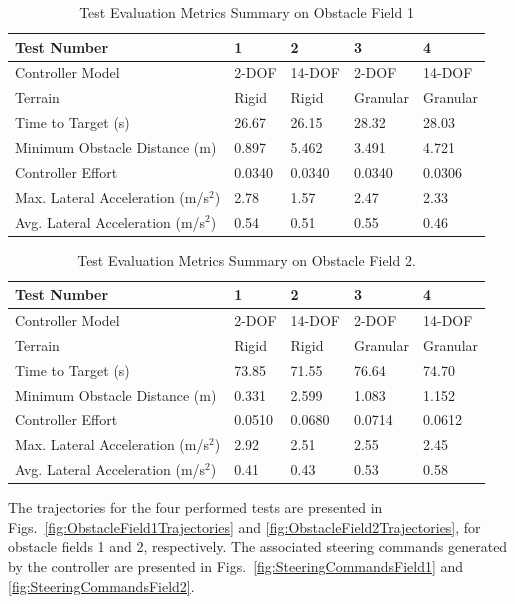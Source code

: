 \documentclass[12pt,onecolumn]{report}
\begin{document}
\begin{table}
		\centering
\begin{tabular}{ ||p{6cm}|p{1.8cm}|p{1.8cm}|p{1.8cm}|p{1.8cm}||  }
		\hline
		Test Number & 1 & 2 & 3 & 4\\
		\hline
		Controller Model & 2-DOF & 14-DOF & 2-DOF & 14-DOF\\
		\hline
		Terrain & Rigid & Rigid & Granular & Granular\\
		\hline
		Time to Target (s)  & 26.67 & 26.15 & 28.32 & 28.03\\ 
		\hline
		Minimum Obstacle Distance (m) & 0.897 & 5.462 & 3.491 & 4.721\\
		\hline
		Controller Effort & 0.0340 & 0.0340 & 0.0340 & 0.0306\\
		\hline
		Max. Lateral Acceleration (m/s$^{2}$)& 2.78 & 1.57 & 2.47 & 2.33 \\
		\hline
		Avg. Lateral Acceleration (m/s$^{2}$) &0.54 & 0.51 & 0.55 & 0.46\\
		\hline
\end{tabular}
\caption{Test Evaluation Metrics Summary on Obstacle Field 1}
\label{t:EvalMetricsObst1}
\end{table}

\begin{table}
		\centering
\begin{tabular}{ ||p{6cm}|p{1.8cm}|p{1.8cm}|p{1.8cm}|p{1.8cm}||  }
		\hline
		Test Number & 1 & 2 & 3 & 4\\
		\hline
		Controller Model & 2-DOF & 14-DOF & 2-DOF & 14-DOF\\
		\hline
		Terrain & Rigid & Rigid & Granular & Granular\\
		\hline
		Time to Target (s)  & 73.85 & 71.55 & 76.64 & 74.70\\ 
		\hline
		Minimum Obstacle Distance (m) & 0.331 & 2.599 & 1.083 & 1.152\\
		\hline
		Controller Effort & 0.0510 & 0.0680 & 0.0714 & 0.0612\\
		\hline
		Max. Lateral Acceleration (m/s$^{2}$)& 2.92 & 2.51 & 2.55 & 2.45 \\
		\hline
		Avg. Lateral Acceleration (m/s$^{2}$) & 0.41 & 0.43 & 0.53 & 0.58\\
		\hline
\end{tabular}
\caption{Test Evaluation Metrics Summary on Obstacle Field 2.}
\label{t:EvalMetricsObst2}
\end{table}

The trajectories for the four performed tests are presented in Figs.~\ref{fig:ObstacleField1Trajectories} and \ref{fig:ObstacleField2Trajectories}, for obstacle fields 1 and 2, respectively. The associated steering commands generated by the controller are presented in Figs.~\ref{fig:SteeringCommandsField1} and \ref{fig:SteeringCommandsField2}. 
\end{document}
